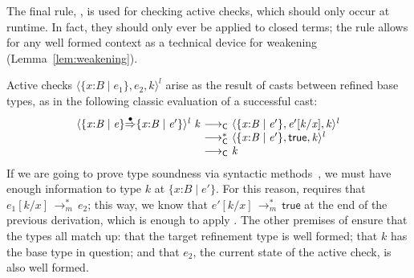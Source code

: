 \documentclass[9pt]{extarticle}
\newcommand{\ottnt}[1]{\mathit{#1}}
\begin{document}
The final rule, , is used for checking active checks, which
should only occur at runtime. In fact, they should only ever be
applied to closed terms; the rule allows for any well formed context
as a technical device for weakening\iffull
(Lemma~\ref{lem:weakening})\fi.

Active checks $ \langle   \{ \mathit{x} \mathord{:} \ottnt{B} \mathrel{\mid} \ottnt{e_{{\mathrm{1}}}} \}  ,  \ottnt{e_{{\mathrm{2}}}} ,  \ottnt{k}  \rangle^{ \ottnt{l} } $ arise as the result of casts
between refined base types, as in the following classic \lambdah
evaluation of a successful cast:
\[ \begin{array}{r@{~}c@{~}l}
   \langle   \{ \mathit{x} \mathord{:} \ottnt{B} \mathrel{\mid} \ottnt{e} \}   \mathord{ \overset{ \bullet }{\Rightarrow} }   \{ \mathit{x} \mathord{:} \ottnt{B} \mathrel{\mid} \ottnt{e'} \}   \rangle^{ \ottnt{l} } ~  \ottnt{k}  & \longrightarrow _{  \mathsf{C}  } &  \langle   \{ \mathit{x} \mathord{:} \ottnt{B} \mathrel{\mid} \ottnt{e'} \}  ,   \ottnt{e'}  [  \ottnt{k} / \mathit{x}  ]  ,  \ottnt{k}  \rangle^{ \ottnt{l} }  \\
  & \longrightarrow ^{*}_{  \mathsf{C}  } &  \langle   \{ \mathit{x} \mathord{:} \ottnt{B} \mathrel{\mid} \ottnt{e'} \}  ,   \mathsf{true}  ,  \ottnt{k}  \rangle^{ \ottnt{l} }  \\
  & \longrightarrow _{  \mathsf{C}  } & \ottnt{k}
\end{array}\]
If we are going to prove type soundness via syntactic
methods~\cite{Wright94syntactic}, we must have enough information to
type $\ottnt{k}$ at $ \{ \mathit{x} \mathord{:} \ottnt{B} \mathrel{\mid} \ottnt{e'} \} $. For this reason,  requires
that $ \ottnt{e_{{\mathrm{1}}}}  [  \ottnt{k} / \mathit{x}  ]  \,  \longrightarrow ^{*}_{ \ottnt{m} }  \, \ottnt{e_{{\mathrm{2}}}}$; this way, we know that $ \ottnt{e'}  [  \ottnt{k} / \mathit{x}  ]  \,  \longrightarrow ^{*}_{ \ottnt{m} }  \,  \mathsf{true} $ at the end of the previous derivation, which is enough to
apply . The other premises of  ensure that the types
all match up: that the target refinement type is well formed; that
$\ottnt{k}$ has the base type in question; and that $\ottnt{e_{{\mathrm{2}}}}$, the current
state of the active check, is also well formed.
\end{document}
